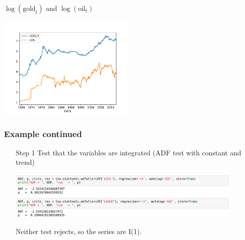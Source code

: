 \begin{frame}
\begin{block}{$\log(\mathrm{gold}_t)$ and $\log(\mathrm{oil}_t)$}
\begin{center}\includegraphics[height=5cm]{oilgold2017}\end{center}
\end{block}
\end{frame}
\begin{frame}\frametitle{Example continued}
\begin{itemize}
\item[Step 1] Test that the variables are integrated (ADF test with constant and trend)
\begin{center}
\includegraphics[width=0.9\textwidth]{oilgold_adf}
\end{center}
Neither test rejects, so the series are I(1).
\end{itemize}
\end{frame}
